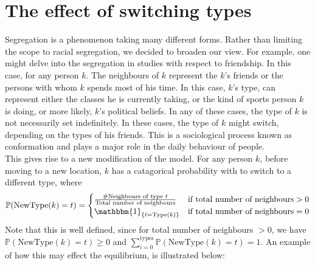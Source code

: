\section{The effect of switching types}
\label{section:switch}
Segregation is a phenomenon taking many different forms. Rather than  limiting the scope to racial segregation, we decided to broaden our view. 
For example, one might delve into the segregation in studies with respect to friendship. 
In this case, for any person \(k\). The neighbours of \(k\) represent the \(k\)'s friends or the persons with whom \(k\) spends most of his time.
In this case, \(k\)'s type, can represent either the classes he is currently taking, or the kind of sports person \(k\) is doing, or more likely, \(k\)'s political beliefs.
In any of these cases, the type of \(k\) is not necessarily set indefinitely.
In these cases, the type of \(k\) might switch, depending on the types of his friends. This is a sociological process known as conformation and plays a major role in the daily behaviour of people.\\

This gives rise to a new modification of the model.
For any person \(k\), before moving to a new location, \(k\) has a catagorical probability with to switch to a different type, where 
\[\mathbb{P}(\text{NewType}(k)=t) = \begin{cases} 
 \frac{\#\text{Neighbours of type }t}{\text{Total number of neighbours}}	&\mbox{if } \text{total number of neighbours}>0 \\ 
\mathbbm{1}_{\{t=\text{Type}(k)\}}   &\mbox{if } \text{total number of neighbours}=0
\end{cases}\]
Note that this is well defined, since for total number of neighbours \(> 0\), we have \( \mathbb{P}(\text{NewType}(k)=t) \geq 0\) and \(\sum_{i=0}^{\text{types}}\mathbb{P}(\text{NewType}(k)=t)=1\). An example of how this may effect the equilibrium, is illustrated below:

